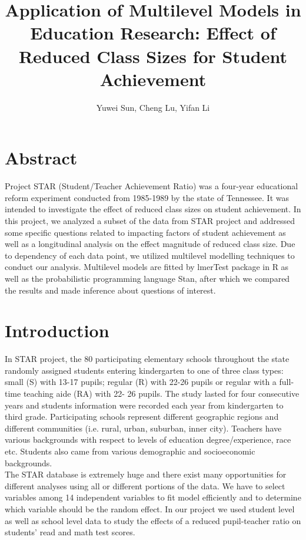 \documentclass{article}
\begin{document}
\title{Application of Multilevel Models in Education Research: Effect of Reduced Class Sizes for Student Achievement}
\author{Yuwei Sun, Cheng Lu, Yifan Li}

\maketitle

\date{}

\section{Abstract}

Project STAR (Student/Teacher Achievement Ratio) was a four-year educational reform experiment conducted from 1985-1989 by the 
state of Tennessee. It was intended to investigate the effect of reduced class sizes on student achievement. In this project, 
we analyzed a subset of the data from STAR project and addressed some specific questions related to impacting factors of student 
achievement as well as a longitudinal analysis on the effect magnitude of reduced class size. Due to dependency of each data point, 
we utilized multilevel modelling techniques to conduct our analysis. Multilevel models are fitted by lmerTest package in R as 
well as the probabilistic programming language Stan, after which we compared the results and made inference about questions of interest. \\

\section{Introduction}

In STAR project, the 80 participating elementary schools throughout the state randomly assigned students entering kindergarten to 
one of three class types: small (S) with 13-17 pupils; regular (R) with 22-26 pupils or regular with a full-time teaching aide (RA) 
with 22- 26 pupils. The study lasted for four consecutive years and students information were recorded each year from kindergarten 
to third grade. Participating schools represent different geographic regions and different communities (i.e. rural, urban, suburban, 
inner city). Teachers have various backgrounds with respect to levels of education degree/experience, race etc. Students also came 
from various demographic and socioeconomic backgrounds.\\

The STAR database is extremely huge and there exist many opportunities for different analyses using all or different portions of the data. 
We have to select variables among 14 independent variables to fit model efficiently and to determine which variable should be the 
random effect. In our project we used student level as well as school level data to study the effects of a reduced pupil-teacher 
ratio on students’ read and math test scores.\\
\end{document}
